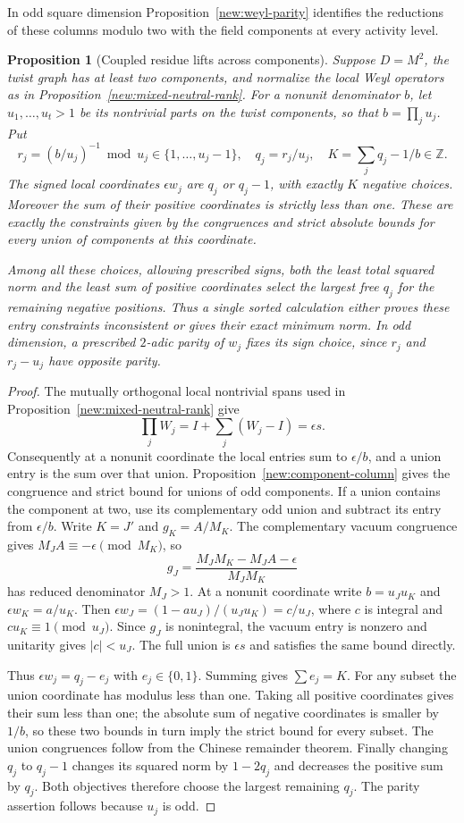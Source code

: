 \documentclass[11pt]{amsart}
\numberwithin{equation}{section}
\newtheorem{proposition}[theorem]{Proposition}
\theoremstyle{definition}
\theoremstyle{plain}
\begin{document}
In odd square dimension Proposition~\ref{new:weyl-parity} identifies the reductions of these columns modulo two with the field components at every activity level.

\begin{proposition}[Coupled residue lifts across components]
\label{new:coupled-weyl}
Suppose $D=M^2$, the twist graph has at least two components,
and normalize the local Weyl operators as in
Proposition~\ref{new:mixed-neutral-rank}. For a nonunit denominator
$b$, let $u_1,\ldots,u_t>1$ be its nontrivial parts on the twist
components, so that $b=\prod_j u_j$. Put
\[
 r_j=(b/u_j)^{-1}\bmod u_j\in\{1,\ldots,u_j-1\},\quad
 q_j=r_j/u_j,\quad K=\sum_j q_j-1/b\in\mathbb Z.
\]
The signed local coordinates $\epsilon w_j$ are $q_j$ or $q_j-1$,
with exactly $K$ negative choices. Moreover the sum of their positive
coordinates is strictly less than one. These are exactly the constraints
given by the congruences and strict absolute bounds for every union
of components at this coordinate.

Among all these choices, allowing prescribed signs, both the least
total squared norm and the least sum of positive coordinates select
the largest free $q_j$ for the remaining negative positions. Thus a
single sorted calculation either proves these entry constraints
inconsistent or gives their exact minimum norm. In odd dimension,
a prescribed $2$-adic parity of $w_j$ fixes its sign choice, since
$r_j$ and $r_j-u_j$ have opposite parity.
\end{proposition}
\begin{proof}
The mutually orthogonal local nontrivial spans used in
Proposition~\ref{new:mixed-neutral-rank} give
\[
 \prod_jW_j=I+\sum_j(W_j-I)=\epsilon s.
\]
Consequently at a nonunit coordinate the local entries sum to
$\epsilon/b$, and a union entry is the sum over that union.
Proposition~\ref{new:component-column} gives the congruence and
strict bound for unions of odd components. If a union contains
the component at two, use its complementary odd union and subtract
its entry from $\epsilon/b$. Write $K=J'$ and $g_K=A/M_K$. The complementary vacuum congruence
gives $M_JA\equiv-\epsilon\pmod{M_K}$, so
\[
 g_J=\frac{M_JM_K-M_JA-\epsilon}{M_JM_K}
\]
has reduced denominator $M_J>1$. At a nonunit coordinate write
$b=u_Ju_K$ and $\epsilon w_K=a/u_K$. Then
$\epsilon w_J=(1-au_J)/(u_Ju_K)=c/u_J$, where $c$ is integral and
$cu_K\equiv1\pmod{u_J}$. Since $g_J$ is nonintegral, the vacuum
entry is nonzero and unitarity gives $|c|<u_J$. The full union is
$\epsilon s$ and satisfies the same bound directly.

Thus $\epsilon w_j=q_j-e_j$ with $e_j\in\{0,1\}$.
Summing gives $\sum e_j=K$. For any subset the union coordinate
has modulus less than one. Taking all positive coordinates gives
their sum less than one; the absolute sum of negative coordinates
is smaller by $1/b$, so these two bounds in turn imply the strict
bound for every subset. The union congruences follow from the
Chinese remainder theorem. Finally changing $q_j$ to $q_j-1$
changes its squared norm by $1-2q_j$ and decreases the positive
sum by $q_j$. Both objectives therefore choose the largest
remaining $q_j$. The parity assertion follows because $u_j$ is odd.
\end{proof}
\end{document}
